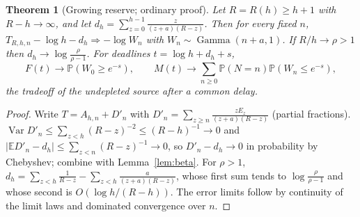 \documentclass[11pt,a4paper]{article}
\theoremstyle{plain}
\newtheorem{theorem}{Theorem}[section]
\theoremstyle{definition}
\theoremstyle{remark}
\newcommand{\E}{\mathbb E}
\newcommand{\Prob}{\mathbb P}
\newcommand{\Var}{\operatorname{Var}}
\newcommand{\Gam}{\operatorname{Gamma}}
\begin{document}
\begin{theorem}[Growing reserve; ordinary proof]\label{thm:reserve}
Let $R=R(h)\ge h+1$ with $R-h\to\infty$, and let $d_h=\sum_{z=0}^{h-1}\frac{z}{(z+a)(R-z)}$. Then for every fixed $n$, $T_{R,h,n}-\log h-d_h\Rightarrow-\log W_n$ with $W_n\sim\Gam(n+a,1)$. If $R/h\to\rho>1$ then $d_h\to\log\frac{\rho}{\rho-1}$. For deadlines $t=\log h+d_h+s$,
\[
F(t)\to\Prob(W_0\ge e^{-s}),\qquad M(t)\to\sum_{n\ge0}\Prob(N=n)\Prob(W_n\le e^{-s}),
\]
the tradeoff of the undepleted source after a common delay.
\end{theorem}
\begin{proof}
Write $T=A_{h,n}+D'_n$ with $D'_n=\sum_{z\ge n}\frac{zE_z}{(z+a)(R-z)}$ (partial fractions). $\Var D'_n\le\sum_{z<h}(R-z)^{-2}\le(R-h)^{-1}\to0$ and $|\E D'_n-d_h|\le\sum_{z<n}(R-z)^{-1}\to0$, so $D'_n-d_h\to0$ in probability by Chebyshev; combine with Lemma~\ref{lem:beta}. For $\rho>1$, $d_h=\sum_{z<h}\frac1{R-z}-\sum_{z<h}\frac{a}{(z+a)(R-z)}$, whose first sum tends to $\log\frac\rho{\rho-1}$ and whose second is $O(\log h/(R-h))$. The error limits follow by continuity of the limit laws and dominated convergence over $n$.
\end{proof}
\end{document}
